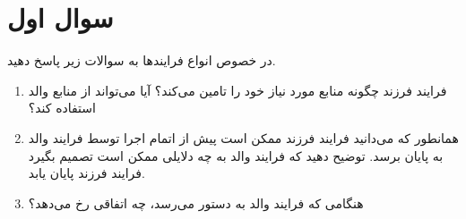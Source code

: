 \section{سوال اول}

در خصوص انواع فرایندها به سوالات زیر پاسخ دهید.
\begin{enumerate}
	\item 
	فرایند فرزند چگونه منابع مورد نیاز خود را تامین می‌کند؟ آیا می‌تواند از منابع والد استفاده کند؟
	\begin{qsolve}
		
	\end{qsolve}
	
	
	
	\item 
	همانطور که می‌دانید فرایند فرزند ممکن است پیش از اتمام اجرا توسط فرایند والد به پایان برسد. توضیح دهید که فرایند والد به چه دلایلی ممکن است تصمیم بگیرد فرایند فرزند پایان یابد.
	\begin{qsolve}
		
	\end{qsolve}
	
	
	
	
	\item 
	هنگامی که فرایند والد به دستور  می‌رسد، چه اتفاقی رخ می‌دهد؟
	\begin{qsolve}
		
	\end{qsolve}
	
\end{enumerate}


